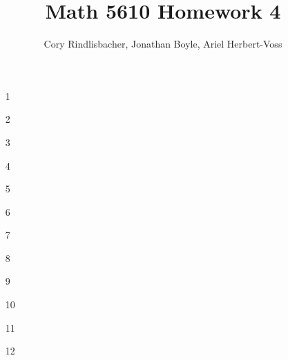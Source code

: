 \documentclass{article}
\title{Math 5610 Homework 4}
\author{Cory Rindlisbacher, Jonathan Boyle, Ariel Herbert-Voss}
\begin{document}
\maketitle

\begin{itemize}
\item[1] 
\item[2] 
\item[3] 
\item[4] 
\item[5] 
\item[6] 
\item[7] 
\item[8] 
\item[9] 
\item[10] 
\item[11] 
\item[12] 
\end{itemize}
\end{document}

